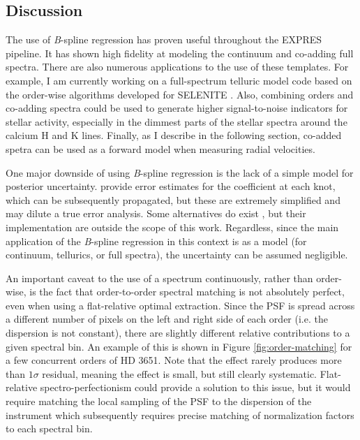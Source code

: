\subsection{Discussion}

The use of \textit{B}-spline regression has proven useful throughout the EXPRES pipeline. It has shown high fidelity at modeling the continuum and co-adding full spectra. There are also numerous applications to the use of these templates. For example, I am currently working on a full-spectrum telluric model code based on the order-wise algorithms developed for SELENITE \citep{leet_toward_2019}. Also, combining orders and co-adding spectra could be used to generate higher signal-to-noise indicators for stellar activity, especially in the dimmest parts of the stellar spectra around the calcium H and K lines. Finally, as I describe in the following section, co-added spetra can be used as a forward model when measuring radial velocities.

One major downside of using \textit{B}-spline regression is the lack of a simple model for posterior uncertainty. \citet{zechmeister_spectrum_2018} provide error estimates for the coefficient at each knot, which can be subsequently propagated, but these are extremely simplified and may dilute a true error analysis. Some alternatives do exist \citep{enting_propagating_2006, gardner_uncertainties_2003-1}, but their implementation are outside the scope of this work. Regardless, since the main application of the \textit{B}-spline regression in this context is as a model (for continuum, tellurics, or full spectra), the uncertainty can be assumed negligible.

An important caveat to the use of a spectrum continuously, rather than order-wise, is the fact that order-to-order spectral matching is not absolutely perfect, even when using a flat-relative optimal extraction. Since the PSF is spread across a different number of pixels on the left and right side of each order (i.e. the dispersion is not constant), there are slightly different relative contributions to a given spectral bin. An example of this is shown in Figure \ref{fig:order-matching} for a few concurrent orders of HD 3651. Note that the effect rarely produces more than $1\sigma$ residual, meaning the effect is small, but still clearly systematic. Flat-relative spectro-perfectionism could provide a solution to this issue, but it would require matching the local sampling of the PSF to the dispersion of the instrument which subsequently requires precise matching of normalization factors to each spectral bin.

